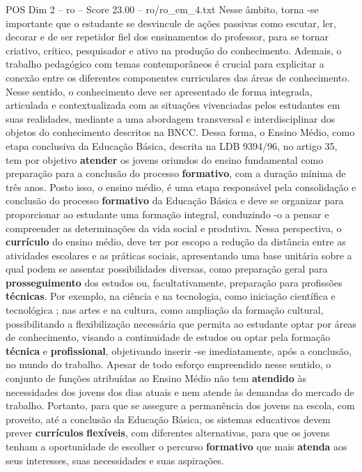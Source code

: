 \begin{textsample}{POS Dim 2 – ro – Score 23.00 – ro/ro\_em\_4.txt}
Nesse âmbito, torna -se importante que o estudante se desvincule de ações passivas como escutar, ler, decorar e de ser repetidor fiel dos ensinamentos do professor, para se tornar criativo, crítico, pesquisador e ativo na produção do conhecimento.
Ademais, o trabalho pedagógico com temas contemporâneos é crucial para explicitar a conexão entre os diferentes componentes curriculares das áreas de conhecimento.
Nesse sentido, o conhecimento deve ser apresentado de forma integrada, articulada e contextualizada com as situações vivenciadas pelos estudantes em suas realidades, mediante a uma abordagem transversal e interdisciplinar dos objetos do conhecimento descritos na BNCC.
Dessa forma, o Ensino Médio, como etapa conclusiva da Educação Básica, descrita na LDB 9394/96, no artigo 35, tem por objetivo \textbf{atender} os jovens oriundos do ensino fundamental como preparação para a conclusão do processo \textbf{formativo}, com a duração mínima de três anos.
Posto isso, o ensino médio, é uma etapa responsável pela consolidação e conclusão do processo \textbf{formativo} da Educação Básica e deve se organizar para proporcionar ao estudante uma formação integral, conduzindo -o a pensar e compreender as determinações da vida social e produtiva.
Nessa perspectiva, o \textbf{currículo} do ensino médio, deve ter por escopo a redução da distância entre as atividades escolares e as práticas sociais, apresentando uma base unitária sobre a qual podem se assentar possibilidades diversas, como preparação geral para \textbf{prosseguimento} dos estudos ou, facultativamente, preparação para profissões \textbf{técnicas}.
Por exemplo, na ciência e na tecnologia, como iniciação científica e tecnológica ; nas artes e na cultura, como ampliação da formação cultural, possibilitando a flexibilização necessária que permita ao estudante optar por áreas de conhecimento, visando a continuidade de estudos ou optar pela formação \textbf{técnica} e \textbf{profissional}, objetivando inserir -se imediatamente, após a conclusão, no mundo do trabalho.
Apesar de todo esforço empreendido nesse sentido, o conjunto de funções atribuídas ao Ensino Médio não tem \textbf{atendido} às necessidades dos jovens dos dias atuais e nem atende às demandas do mercado de trabalho.
Portanto, para que se assegure a permanência dos jovens na escola, com proveito, até a conclusão da Educação Básica, os sistemas educativos devem prever \textbf{currículos} \textbf{flexíveis}, com diferentes alternativas, para que os jovens tenham a oportunidade de escolher o percurso \textbf{formativo} que mais \textbf{atenda} aos seus interesses, suas necessidades e suas aspirações.

\end{textsample}
